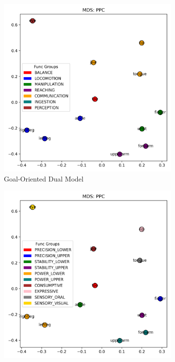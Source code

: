 \documentclass{article}
\begin{document}
\begin{figure}[!htbp]
\begin{subfigure}[b]{0.45\textwidth}
        \includegraphics[width=\textwidth]{results/goal_dual/mds_PPC.png}
        \caption{Goal-Oriented Dual Model}
        \label{fig:mds_goal_dual}
    \end{subfigure}
    \vspace{0.5em}
    \begin{subfigure}[b]{0.45\textwidth}
        \centering
        \includegraphics[width=\textwidth]{results/func_task/mds_PPC.png}

\end{subfigure}
\end{figure}
\end{document}
